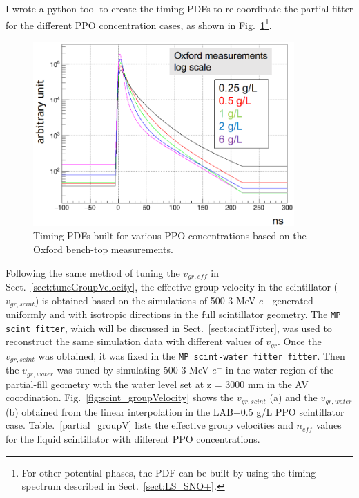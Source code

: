 I wrote a python tool to create the timing PDFs to re-coordinate the partial fitter for the different PPO concentration cases\cite{partialFitterPDF}, as shown in Fig.~\ref{fig:oxfordPdf}\footnote{For other potential phases, the PDF can be built by using the timing spectrum described in Sect.~\ref{sect:LS_SNO+}.}.
\begin{figure}[!htb]
	\centering
	\includegraphics[width=10cm]{oxfordPdf_log.png}
	\caption{Timing PDFs built for various PPO concentrations based on the Oxford bench-top measurements.}
	\label{fig:oxfordPdf}
\end{figure}

Following the same method of tuning the $v_{gr,eff}$ in Sect.~\ref{sect:tuneGroupVelocity}, the effective group velocity in the scintillator ($v_{gr,scint}$) is obtained based on the simulations of 500 3-MeV $e^-$ generated uniformly and with isotropic directions in the full scintillator geometry. The \texttt{MP scint fitter}, which will be discussed in Sect.~\ref{sect:scintFitter}, was used to reconstruct the same simulation data with different values of $v_{gr}$. Once the $v_{gr,scint}$ was obtained, it was fixed in the \texttt{MP scint-water fitter fitter}. Then the $v_{gr,water}$ was tuned by simulating 500 3-MeV $e^-$ in the water region of the partial-fill geometry with the water level set at z = 3000 mm in the AV coordination. Fig.~\ref{fig:scint_groupVelocity} shows the $v_{gr,scint}$ (a) and the $v_{gr,water}$ (b) obtained from the linear interpolation in the LAB+0.5 g/L PPO scintillator case. Table.~\ref{partial_groupV} lists the effective group velocities and $n_{eff}$ values for the liquid scintillator with different PPO concentrations. 
		
